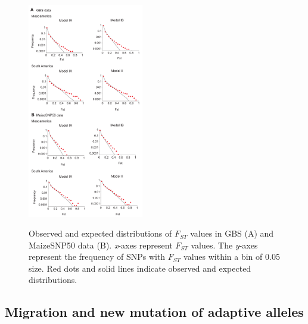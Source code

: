 \begin{figure}[tb]   
  \begin{center}
   \vspace{-0mm}
   \includegraphics[width=0.45\textwidth]{fig/Fig5}
   \renewcommand{\baselinestretch}{0.9}
   \vspace{-3mm}
   \caption{Observed and expected distributions of $F_{ST}$ values in GBS (A) and MaizeSNP50 data (B).  \The \emph{x}-axes represent $F_{ST}$ values.  The \emph{y}-axes represent the frequency of SNPs with $F_{ST}$ values within a bin of 0.05 size.  Red dots and solid lines indicate observed and expected distributions. %
   }
\vspace{-6mm}
    \label{FstDist}
  \end{center}
\end{figure}


\subsection*{Migration and new mutation of adaptive alleles}

